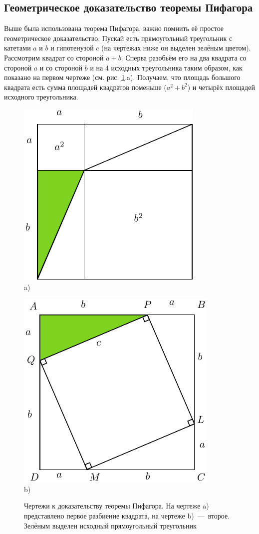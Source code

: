 \documentclass[titlepage]{article}
\begin{document}
\subsection{Геометрическое доказательство теоремы Пифагора}
Выше была использована теорема Пифагора, важно помнить её простое геометрическое доказательство. Пускай есть прямоугольный треугольник с катетами $a$ и $b$ и гипотенузой $c$ (на чертежах ниже он выделен зелёным цветом). Рассмотрим квадрат со стороной $a+b$. Сперва разобьём его на два квадрата со стороной $a$ и со стороной $b$ и на 4 исходных треугольника таким образом, как показано на первом чертеже (см. рис. \ref{fig:3}.a). Получаем, что площадь большого квадрата есть сумма площадей квадратов поменьше ($a^2+b^2$) и четырёх площадей исходного треугольника.
\begin{figure}[h]
\begin{minipage}[h]{0.49\linewidth}
 \centering
 \includegraphics[scale = 1]{first21.pdf}
 \\
 a)
\end{minipage}
\hfill
\begin{minipage}[h]{0.49\linewidth}
 \centering
 \includegraphics[scale = 1]{first22.pdf}
 \\
 b)
\end{minipage}
\caption{Чертежи к доказательству теоремы Пифагора. На чертеже a) представлено первое разбиение квадрата, на чертеже b)~\----~второе. Зелёным выделен исходный прямоугольный треугольник}
\label{fig:3}
\end{figure}
\end{document}
